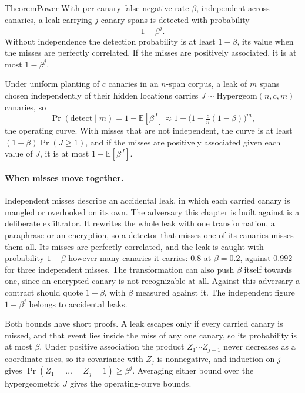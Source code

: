 \documentclass[11pt,a4paper]{article}
\theoremstyle{definition}
\begin{document}
\begin{pdclaim}{Theorem}{Power}
\setlength{\parskip}{4pt plus 1pt}
\label{thm:sealed-power}
With per-canary false-negative rate $\beta$, independent across canaries, a
leak carrying $j$ canary spans is detected with probability
\[
1-\beta^j.
\]
Without independence the detection probability is at least $1-\beta$, its
value when the misses are perfectly correlated. If the misses are positively
associated, it is at most $1-\beta^j$.

Under uniform planting of $c$ canaries in an $n$-span corpus, a leak of $m$ spans
chosen independently of their hidden locations
carries $J\sim\mathrm{Hypergeom}(n,c,m)$ canaries, so
\[
\Pr(\text{detect}\mid m)=1-\mathbb{E}[\beta^J]\approx
1-\bigl(1-\tfrac{c}{n}(1-\beta)\bigr)^m,
\]
the operating curve. With misses that are not independent, the curve is at
least $(1-\beta)\Pr(J\ge1)$, and if the misses are positively associated
given each value of $J$, it is at most $1-\mathbb{E}[\beta^J]$.
\end{pdclaim}

\paragraph{When misses move together.}
Independent misses describe an accidental leak, in which each carried canary
is mangled or overlooked on its own. The adversary this chapter is built
against is a deliberate exfiltrator. It rewrites the whole leak with one
transformation, a paraphrase or an encryption, so a detector that misses one
of its canaries misses them all. Its misses are perfectly correlated, and the
leak is caught with probability $1-\beta$ however many canaries it carries:
$0.8$ at $\beta=0.2$, against $0.992$ for three independent misses. The
transformation can also push $\beta$ itself towards one, since an encrypted
canary is not recognizable at all. Against this adversary a contract should
quote $1-\beta$, with $\beta$ measured against it. The independent figure
$1-\beta^j$ belongs to accidental leaks.

Both bounds have short proofs. A leak escapes only if every carried canary
is missed, and that event lies inside the miss of any one canary, so its
probability is at most $\beta$. Under positive association the product
$Z_1\cdots Z_{j-1}$ never decreases as a coordinate rises, so its covariance
with $Z_j$ is nonnegative, and induction on $j$ gives
$\Pr(Z_1=\dots=Z_j=1)\ge\beta^j$. Averaging either bound over the
hypergeometric $J$ gives the operating-curve bounds.
\end{document}
